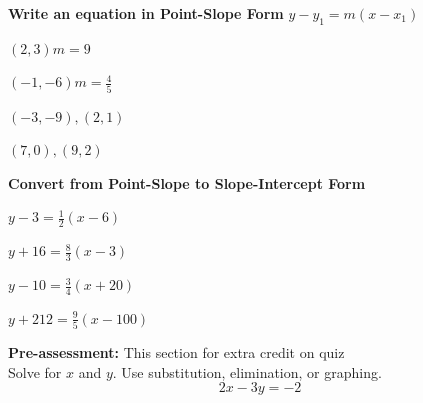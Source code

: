 \documentclass[12pt]{article}
\begin{document}
\pagebreak

\textbf{Write an equation in Point-Slope Form} $y-y_1=m(x-x_1)$\\

\begin{enumerate}[resume]
\begin{multicols}{2}

\item $(2,3) m=9$\\

\item $(-1,-6) m=\frac{4}{5}$\\

\item $(-3,-9), (2, 1)$\\

\item $(7,0),(9,2)$\\

\end{multicols}
\end{enumerate}

\hrulefill

\textbf{Convert from Point-Slope to Slope-Intercept Form}\\

\begin{enumerate}[resume]
\begin{multicols}{2}

\item $y-3=\frac{1}{2}(x-6)$\\

\item $y+16=\frac{8}{3}(x-3)$\\

\item $y-10=\frac{3}{4}(x+20)$\\

\item $y+212=\frac{9}{5}(x-100)$\\


\end{multicols}
\end{enumerate}

\hrulefill

\textbf{Pre-assessment:}  This section for extra credit on quiz\\

Solve for $x$ and $y$. Use substitution, elimination, or graphing.\\

$$2x-3y=-2$$
\end{document}
